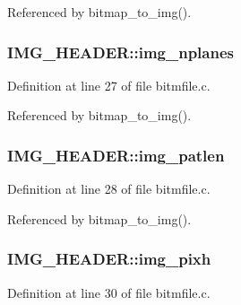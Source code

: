Referenced by bitmap\+\_\+to\+\_\+img().

\hypertarget{structIMG__HEADER_a0371340a9a26039949001413dde2b128}{
\subsubsection[{img\+\_\+nplanes}]{ I\+M\+G\+\_\+\+H\+E\+A\+D\+E\+R\+::img\+\_\+nplanes}}\label{structIMG__HEADER_a0371340a9a26039949001413dde2b128}


Definition at line 27 of file bitmfile.\+c.



Referenced by bitmap\+\_\+to\+\_\+img().

\hypertarget{structIMG__HEADER_a556c0023a2d062dbfde5d3a019eced72}{
\subsubsection[{img\+\_\+patlen}]{ I\+M\+G\+\_\+\+H\+E\+A\+D\+E\+R\+::img\+\_\+patlen}}\label{structIMG__HEADER_a556c0023a2d062dbfde5d3a019eced72}


Definition at line 28 of file bitmfile.\+c.



Referenced by bitmap\+\_\+to\+\_\+img().

\hypertarget{structIMG__HEADER_a8cc61573c18a478c0675f78ba8241731}{
\subsubsection[{img\+\_\+pixh}]{ I\+M\+G\+\_\+\+H\+E\+A\+D\+E\+R\+::img\+\_\+pixh}}\label{structIMG__HEADER_a8cc61573c18a478c0675f78ba8241731}


Definition at line 30 of file bitmfile.\+c.



